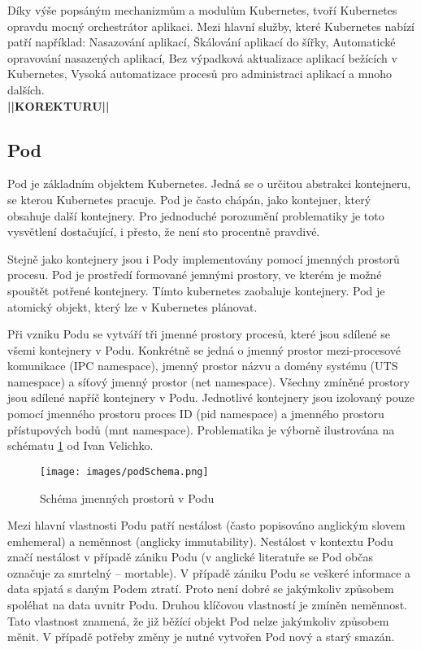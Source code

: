 Díky výše popsáným mechanizmům a modulům Kubernetes, tvoří Kubernetes opravdu mocný orchestrátor aplikaci. Mezi hlavní služby, které Kubernetes nabízí patří například: Nasazování aplikací, Škálování aplikací do šířky, Automatické opravování nasazených aplikací, Bez výpadková aktualizace aplikací bežících v Kubernetes, Vysoká automatizace procesů pro administraci aplikací a mnoho dalších. \cite{poulton_2022_the}\\
\textbf{||KOREKTURU||}
\subsection{Pod}
Pod je základním objektem Kubernetes. Jedná se o určitou abstrakci kontejneru, se kterou Kubernetes pracuje. Pod je často chápán, jako kontejner, který obsahuje další kontejnery. Pro jednoduché porozumění problematiky je toto vysvětlení dostačující, i přesto, že není sto procentně pravdivé.

Stejně jako kontejnery jsou i Pody implementovány pomocí jmenných prostorů procesu. Pod je prostředí formované jemnými prostory, ve kterém je možné spouštět potřené kontejnery. Tímto kubernetes zaobaluje kontejnery. Pod je atomický objekt, který lze v Kubernetes plánovat.

Při vzniku Podu se vytváří tři jmenné prostory procesů, které jsou sdílené se všemi kontejnery v Podu. Konkrétně se jedná o jmenný prostor mezi-procesové komunikace (IPC namespace), jmenný prostor názvu a domény systému (UTS namespace) a síťový jmenný prostor (net namespace). Všechny zmíněné prostory jsou sdílené napříč kontejnery v Podu. Jednotlivé kontejnery jsou izolovaný pouze pomocí jmenného prostoru proces ID (pid namespace)
a jmenného prostoru přístupových bodů (mnt namespace). Problematika je výborně ilustrována na schématu \ref{img:podSchema} od Ivan Velichko.
\begin{figure}[ht]
\centering
\texttt{[image: images/podSchema.png]}
\caption[Schéma jmenných prostorů v Podu]{Schéma jmenných prostorů v Podu \cite{velichko_2021_kubernetes}}\label{img:podSchema}
\end{figure}

Mezi hlavní vlastnosti Podu patří nestálost (často popisováno anglickým slovem emhemeral) a neměnnost (anglicky immutability). Nestálost v kontextu Podu značí nestálost v případě zániku Podu (v anglické literatuře se Pod občas označuje za smrtelný -- mortable). V případě zániku Podu se veškeré informace a data spjatá s daným Podem ztratí. Proto není dobré se jakýmkoliv způsobem spoléhat na data uvnitr Podu. Druhou klíčovou vlastností je zmíněn neměnnost. Tato vlastnost znamená, že již běžící objekt Pod nelze jakýmkoliv způsobem měnit. V případě potřeby změny je nutné vytvořen Pod nový a starý smazán. \cite{poulton_2022_the}

